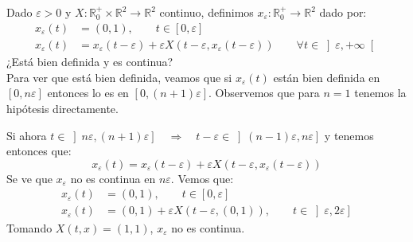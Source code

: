 \begin{ejercicio}
    Dado $\varepsilon>0$ y $X:\mathbb{R}^+_0\times \mathbb{R}^2\to \mathbb{R}^2$ continuo, definimos $x_\varepsilon:\mathbb{R}^+_0\to \mathbb{R}^2$ dado por:
    \begin{align*}
        x_\varepsilon(t) &= (0,1), \qquad t\in [0,\varepsilon] \\
        x_\varepsilon(t) &= x_\varepsilon(t-\varepsilon) + \varepsilon X(t-\varepsilon,x_\varepsilon(t-\varepsilon)) \qquad \forall t\in \left]\varepsilon,+\infty\right[
    \end{align*}
    ¿Está bien definida y es continua?\\

    \noindent
    Para ver que está bien definida, veamos que si $x_{\varepsilon}(t)$ están bien definida en $[0,n\varepsilon]$ entonces lo es en $[0,(n+1)\varepsilon]$. Observemos que para $n=1$ tenemos la hipótesis directamente.

    \noindent
    Si ahora $t\in \left]n\varepsilon, (n+1)\varepsilon\right] \quad\Longrightarrow\quad t-\varepsilon \in \left](n-1)\varepsilon,n\varepsilon\right]$ y tenemos entonces que:
    \begin{equation*}
        x_\varepsilon(t) = x_\varepsilon(t-\varepsilon) + \varepsilon X(t-\varepsilon, x_\varepsilon(t-\varepsilon))
    \end{equation*}
    Se ve que $x_\varepsilon$ no es continua en $n\varepsilon$. Vemos que:
    \begin{align*}
        x_\varepsilon(t) &= (0,1), \qquad t\in [0,\varepsilon] \\
        x_\varepsilon(t) &= (0,1) + \varepsilon X(t-\varepsilon,(0,1)), \qquad t\in \left]\varepsilon,2\varepsilon\right]
    \end{align*}
    Tomando $X(t,x) = (1,1)$, $x_\varepsilon$ no es continua.
\end{ejercicio}

